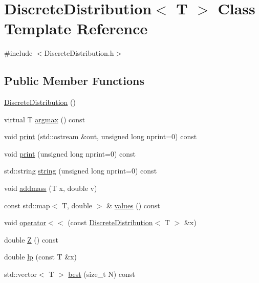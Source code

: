 \hypertarget{class_discrete_distribution}{}\section{Discrete\+Distribution$<$ T $>$ Class Template Reference}
\label{class_discrete_distribution}


{\ttfamily \#include $<$Discrete\+Distribution.\+h$>$}

\subsection*{Public Member Functions}
\begin{DoxyCompactItemize}
\item 
\hyperlink{class_discrete_distribution_a8ffb7c55f85cf42af7aec6deb97ec4ab}{Discrete\+Distribution} ()
\item 
virtual T \hyperlink{class_discrete_distribution_a7cf660223fe0f86b61e3b33268204c06}{argmax} () const
\item 
void \hyperlink{class_discrete_distribution_a6ec6f590a3659c8bef32aaab77a8052e}{print} (std\+::ostream \&out, unsigned long nprint=0) const
\item 
void \hyperlink{class_discrete_distribution_a58bc689015e6b594ed1a53130758ba6f}{print} (unsigned long nprint=0) const
\item 
std\+::string \hyperlink{class_discrete_distribution_a87d866919f4698e488aee9ce4bc42ed5}{string} (unsigned long nprint=0) const
\item 
void \hyperlink{class_discrete_distribution_a6c41c7f4726019bc213d37d4e3cdea27}{addmass} (T x, double v)
\item 
const std\+::map$<$ T, double $>$ \& \hyperlink{class_discrete_distribution_a995377a760a6fe0d44077892053acdbb}{values} () const
\item 
void \hyperlink{class_discrete_distribution_a5c93983e2375a2353b10b82ebb11f751}{operator$<$$<$} (const \hyperlink{class_discrete_distribution}{Discrete\+Distribution}$<$ T $>$ \&x)
\item 
double \hyperlink{class_discrete_distribution_ad634a339172a69c006fded1beb423bb7}{Z} () const
\item 
double \hyperlink{class_discrete_distribution_a185ef689b1e133b962fff5bcf1443ba1}{lp} (const T \&x)
\item 
std\+::vector$<$ T $>$ \hyperlink{class_discrete_distribution_adee72a8e4c93aa03d841c0c73d6b5498}{best} (size\+\_\+t N) const

\end{DoxyCompactItemize}
